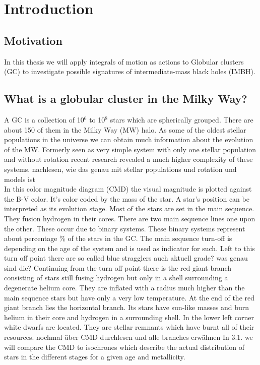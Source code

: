 

\section{Introduction}

\subsection{Motivation}
In this thesis we will apply integrals of motion as actions to Globular clusters (GC) to investigate possible signatures of intermediate-mass black holes (IMBH). 
\subsection{What is a globular cluster in the Milky Way?}
A GC is a collection of 10\(^6\) to 10\(^8\) stars which are spherically grouped. There are about 150 of them in the Milky Way (MW) halo. As some of the oldest stellar populations in the universe we can obtain much information about the evolution of the MW. Formerly seen as very simple system with only one stellar population and without rotation recent research revealed a much higher complexity of these systems. \color{red} nachlesen, wie das genau mit stellar populations und rotation und models ist \color{black}
\\In this color magnitude diagram (CMD) the visual magnitude is plotted against the B-V color. It's color coded by the mass of the star. A star's position can be interpreted as its evolution stage. Most of the stars are set in the main sequence. They fusion hydrogen in their cores. There are two main sequence lines one upon the other. These occur due to binary systems. These binary systems represent about \color{red} percentage \color{black} \% of the stars in the GC. The main sequence turn-off is depending on the age of the system and is used as indicator for such. Left to this turn off point there are so called blue stragglers \color{red} auch aktuell grade? was genau sind die? \color{black} Continuing from the turn off point there is the red giant branch consisting of stars still fusing hydrogen but only in a shell surrounding a degenerate helium core. They are inflated with a radius much higher than the main sequence stars but have only a very low temperature. At the end of the red giant branch lies the horizontal branch. Its stars have sun-like masses and burn helium in their core and hydrogen in a surrounding shell. In the lower left corner white dwarfs are located. They are stellar remnants which have burnt all of their resources. \color{red} nochmal über CMD durchlesen und alle branches erwähnen \color{black} In 3.1. we will compare the CMD to isochrones which describe the actual distribution of stars in the different stages for a given age and metallicity. 
